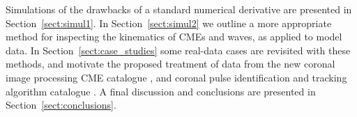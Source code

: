 \documentclass[structabstract]{aa}
\begin{document}
Simulations of the drawbacks of a standard numerical derivative are presented in Section~\ref{sect:simul1}. In Section~\ref{sect:simul2} we outline a more appropriate method for inspecting the  kinematics of CMEs and waves, as applied to model data. In Section~\ref{sect:case_studies} some real-data cases are revisited with these methods, and motivate the proposed treatment of data from the new coronal image processing CME catalogue \citep[CORIMP;][]{2012ApJ...752..144M, 2012ApJ...752..145B}, and coronal pulse identification and tracking algorithm catalogue \citep[CorPITA;][]{2011A&A...531A..42L}. A final discussion and conclusions are presented in Section~\ref{sect:conclusions}.


\begin{figure}[!ht]
\centering
{}

\end{figure}
\end{document}
